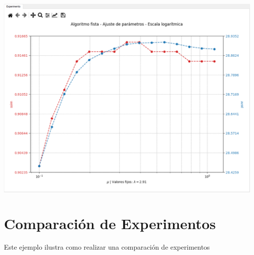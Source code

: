 \documentclass[12pt,twoside,letter]{ol-softwaremanual}
\newenvironment{Figure}
  {\par\medskip\noindent\minipage{\linewidth}}
  {\endminipage\par\medskip}
\begin{document}
\begin{enumerate}
	\begin{Figure}
	\centering
	\includegraphics[width=1\linewidth]{tuning-2.png}
	\label{fig:tuning_2}
	\end{Figure}

\end{enumerate}

\section{Comparación de Experimentos}

Este ejemplo ilustra como realizar una comparación de experimentos
\end{document}
